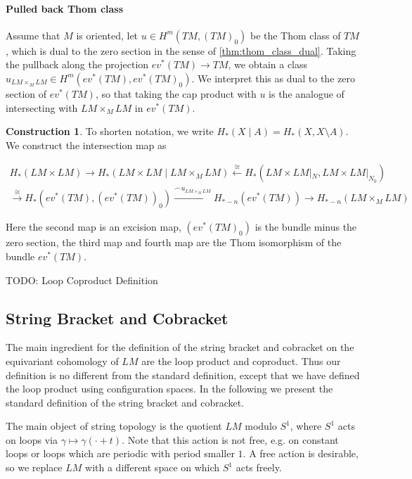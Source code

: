 \documentclass{scrartcl}
\theoremstyle{plain}
\theoremstyle{definition}
\newtheorem{construction}[theorem]{Construction}
\newcommand{\capp}{\mathbin{\frown}}
\newcommand{\iso}{\cong}
\let\xto\xrightarrow
\let\xfrom\xleftarrow
\begin{document}
\paragraph{Pulled back Thom class}

Assume that $M$ is oriented, let $u\in H^m(TM, (TM)_0)$ be the Thom class of $TM$, which is dual to the zero section in the sense of \ref{thm:thom_class_dual}. Taking the pullback along the projection $ev^*(TM)\to TM$, we obtain a class $u_{LM\times_M LM} \in H^m(ev^*(TM), ev^*(TM)_0)$. We interpret this as dual to the zero section of $ev^*(TM)$, so that taking the cap product with $u$ is the analogue of intersecting with  $LM\times_M LM$ in $ev^*(TM)$.


\begin{construction}
To shorten notation, we write $H_*(X \mid A) = H_*(X, X\setminus A)$. We construct the intersection map as 

\begin{align*}
    H_*(LM\times LM) \to H_*(LM\times LM \mid LM\times_M LM) \xfrom{\iso} H_*(LM\times LM |_N, LM\times LM|_{N_0}) \\ \xto{\iso} H_*(ev^*(TM), (ev^*(TM))_0) \xto{\capp u_{LM\times_M LM}} H_{*-n}(ev^*(TM)) \to H_{*-n}(LM\times_M LM)
\end{align*}

Here the second map is an excision map, $(ev^*(TM)_0)$ is the bundle minus the zero section, the third map and fourth map are the Thom isomorphism of the bundle $ev^*(TM)$.

\end{construction}

TODO: Loop Coproduct Definition

\subsection{String Bracket and Cobracket}
The main ingredient for the definition of the string bracket and cobracket on the equivariant cohomology of $LM$ are the loop product and coproduct. Thus our definition is no different from the standard definition, except that we have defined the loop product using configuration spaces. In the following we present the standard definition of the string bracket and cobracket.

The main object of string topology is the quotient $LM$ modulo $S^1$, where $S^1$ acts on loops via $\gamma\mapsto \gamma(\cdot + t)$. Note that this action is not free, e.g. on constant loops or loops which are periodic with period smaller $1$. A free action is desirable, so we replace $LM$ with a different space on which $S^1$ acts freely.
\end{document}
